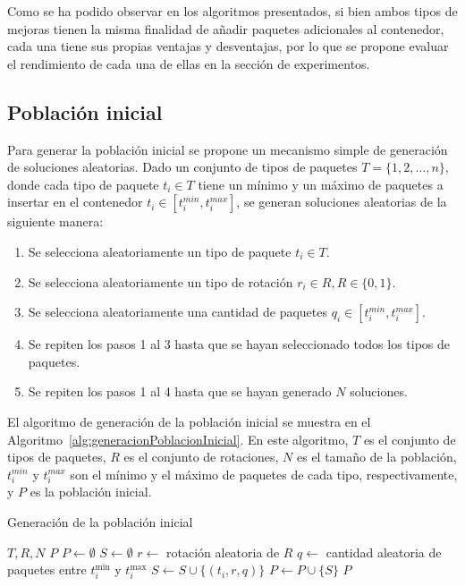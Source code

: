 Como se ha podido observar en los algoritmos presentados, si bien ambos tipos de mejoras tienen la misma finalidad de añadir paquetes adicionales al contenedor, cada una tiene sus propias ventajas y desventajas, por lo que se propone evaluar el rendimiento de cada una de ellas en la sección de experimentos.


\subsection{Población inicial}

Para generar la población inicial se propone un mecanismo simple de generación de soluciones aleatorias. Dado un conjunto de tipos de paquetes $T = \{1,2, \ldots, n\}$, donde cada tipo de paquete $t_i \in T$ tiene un mínimo y un máximo de paquetes a insertar en el contenedor $t_i \in [t_i^{min},t_i^{max}]$, se generan soluciones aleatorias de la siguiente manera:

\begin{enumerate}
    \item Se selecciona aleatoriamente un tipo de paquete $t_i \in T$.
    \item Se selecciona aleatoriamente un tipo de rotación $r_i \in R, R \in \{0,1\}$.
    \item Se selecciona aleatoriamente una cantidad de paquetes $q_i \in [t_i^{min},t_i^{max}]$.
    \item Se repiten los pasos 1 al 3 hasta que se hayan seleccionado todos los tipos de paquetes.
    \item Se repiten los pasos 1 al 4 hasta que se hayan generado $N$ soluciones.
\end{enumerate}

El algoritmo de generación de la población inicial se muestra en el Algoritmo~\ref{alg:generacionPoblacionInicial}. En este algoritmo, $T$ es el conjunto de tipos de paquetes, $R$ es el conjunto de rotaciones, $N$ es el tamaño de la población, $t_i^{min}$ y $t_i^{max}$ son el mínimo y el máximo de paquetes de cada tipo, respectivamente, y $P$ es la población inicial.

\begin{algorithm}[H]
    \caption{Generación de la población inicial}\label{alg:generacionPoblacionInicial}
    \begin{algorithmic}[1]
        \Require $T, R, N$
        \Ensure $P$
        \State $P \leftarrow \emptyset$
        \State $S \leftarrow \emptyset$
        \State $r \leftarrow$ rotación aleatoria de $R$
        \State $q \leftarrow$ cantidad aleatoria de paquetes entre $t_i^{\min}$ y $t_i^{\max}$
        \State $S \leftarrow S \cup \{(t_i, r, q)\}$
        \EndFor
        \State $P \leftarrow P \cup \{S\}$
        \EndFor
        \State \Return $P$
    \end{algorithmic}
\end{algorithm}

